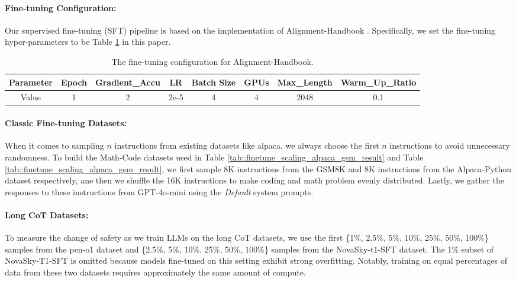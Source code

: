 \paragraph{Fine-tuning Configuration: } Our supervised fine-tuning (SFT) pipeline is based on the implementation of Alignment-Handbook \citep{Tunstall_The_Alignment_Handbook}. Specifically, we set the fine-tuning hyper-parameters to be Table \ref{tab::finetuning_parameter} in this paper. 

\begin{table}[h]
    \centering
    \caption{The fine-tuning configuration for Alignment-Handbook.}
    \small
    \begin{tabular}{| c | c c c c c c c|}
        \toprule
         Parameter & Epoch & Gradient\_Accu & LR & Batch Size & GPUs & Max\_Length & Warm\_Up\_Ratio  \\
         \midrule
         Value & 1 & 2 & 2e-5 & 4 & 4 & 2048 & 0.1 \\
         \bottomrule
    \end{tabular}
    \label{tab::finetuning_parameter}
\end{table}

\paragraph{Classic Fine-tuning Datasets: }When it comes to sampling $n$ instructions from existing datasets like alpaca, we always choose the first $n$ instructions to avoid unnecessary randomness. To build the Math-Code datasets used in Table \ref{tab::finetune_scaling_alpaca_gsm_result} and Table \ref{tab::finetune_scaling_alpaca_gsm_result}, we first sample 8K instructions from the GSM8K \citep{cobbe2021training} and 8K instructions from the Alpaca-Python \citep{alpaca-python} dataset respectively, ane then we shuffle the 16K instructions to make coding and math problem evenly distributed. Lastly, we gather the responses to these instructions from GPT-4o-mini \citep{gpt4} using the \textit{Default} system prompts. 

\paragraph{Long CoT Datasets: }To measure the change of safety as we train LLMs on the long CoT datasets, we use the first \{1\%, 2.5\%, 5\%, 10\%, 25\%, 50\%, 100\%\} samples from the pen-o1 dataset \citep{open-o1-2025} and \{2.5\%, 5\%, 10\%, 25\%, 50\%, 100\%\} samples from the NovaSky-t1-SFT \citep{sky-t1-2025} dataset. The 1\% subset of NovaSky-T1-SFT is omitted because models fine-tuned on this setting exhibit strong overfitting. Notably, training on equal percentages of data from these two datasets requires approximately the same amount of compute.


